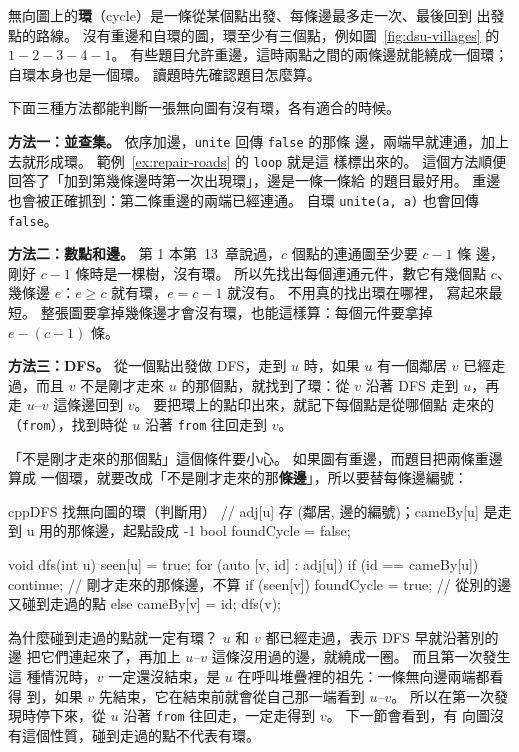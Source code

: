 無向圖上的\textbf{環}（cycle）是一條從某個點出發、每條邊最多走一次、最後回到
出發點的路線。 沒有重邊和自環的圖，環至少有三個點，例如圖~\ref{fig:dsu-villages}
的 $1 - 2 - 3 - 4 - 1$。 有些題目允許重邊，這時兩點之間的兩條邊就能繞成一個環；
自環本身也是一個環。 讀題時先確認題目怎麼算。

下面三種方法都能判斷一張無向圖有沒有環，各有適合的時候。

\textbf{方法一：並查集。} 依序加邊，\texttt{unite} 回傳 \texttt{false} 的那條
邊，兩端早就連通，加上去就形成環。 範例~\ref{ex:repair-roads} 的 \texttt{loop} 就是這
樣標出來的。 這個方法順便回答了「加到第幾條邊時第一次出現環」，邊是一條一條給
的題目最好用。 重邊也會被正確抓到：第二條重邊的兩端已經連通。 自環
\texttt{unite(a, a)} 也會回傳 \texttt{false}。

\textbf{方法二：數點和邊。} 第 1 本第~13~章說過，$c$ 個點的連通圖至少要 $c - 1$ 條
邊，剛好 $c - 1$ 條時是一棵樹，沒有環。 所以先找出每個連通元件，數它有幾個點
$c$、幾條邊 $e$：$e \ge c$ 就有環，$e = c - 1$ 就沒有。 不用真的找出環在哪裡，
寫起來最短。 整張圖要拿掉幾條邊才會沒有環，也能這樣算：每個元件要拿掉
$e - (c - 1)$ 條。

\textbf{方法三：DFS。} 從一個點出發做 DFS，走到 $u$ 時，如果 $u$ 有一個鄰居 $v$
已經走過，而且 $v$ 不是剛才走來 $u$ 的那個點，就找到了環：從 $v$ 沿著 DFS 走到
$u$，再走 $u$--$v$ 這條邊回到 $v$。 要把環上的點印出來，就記下每個點是從哪個點
走來的（\texttt{from}），找到時從 $u$ 沿著 \texttt{from} 往回走到 $v$。

「不是剛才走來的那個點」這個條件要小心。 如果圖有重邊，而題目把兩條重邊算成
一個環，就要改成「不是剛才走來的那\textbf{條邊}」，所以要替每條邊編號：

\begin{code}{cpp}{DFS 找無向圖的環（判斷用）}
// adj[u] 存 (鄰居, 邊的編號)；cameBy[u] 是走到 u 用的那條邊，起點設成 -1
bool foundCycle = false;

void dfs(int u) {
    seen[u] = true;
    for (auto [v, id] : adj[u]) {
        if (id == cameBy[u]) {
            continue;                  // 剛才走來的那條邊，不算
        }
        if (seen[v]) {
            foundCycle = true;         // 從別的邊又碰到走過的點
        } else {
            cameBy[v] = id;
            dfs(v);
        }
    }
}
\end{code}

為什麼碰到走過的點就一定有環？ $u$ 和 $v$ 都已經走過，表示 DFS 早就沿著別的邊
把它們連起來了，再加上 $u$--$v$ 這條沒用過的邊，就繞成一圈。 而且第一次發生這
種情況時，$v$ 一定還沒結束，是 $u$ 在呼叫堆疊裡的祖先：一條無向邊兩端都看得
到，如果 $v$ 先結束，它在結束前就會從自己那一端看到 $u$--$v$。 所以在第一次發
現時停下來，從 $u$ 沿著 \texttt{from} 往回走，一定走得到 $v$。 下一節會看到，有
向圖沒有這個性質，碰到走過的點不代表有環。

